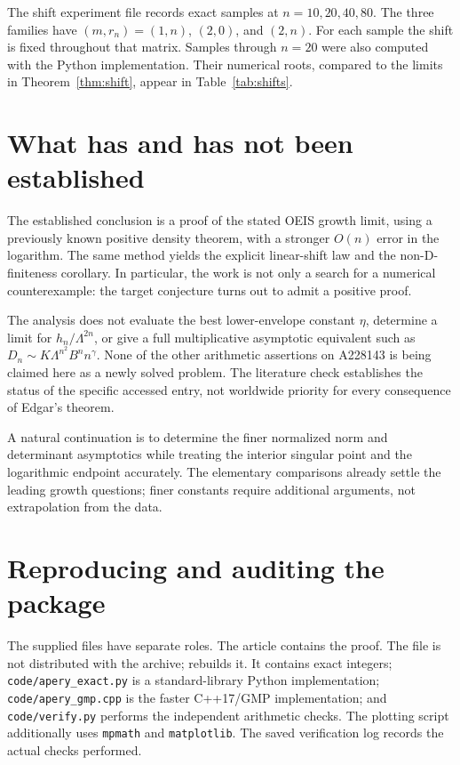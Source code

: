\documentclass[11pt,a4paper]{article}
\numberwithin{equation}{section}
\theoremstyle{remark}\newtheorem{remark}[theorem]{Remark}
\begin{document}
The shift experiment file records exact samples at $n=10,20,40,80$.
The three families have $(m,r_n)=(1,n)$, $(2,0)$, and $(2,n)$. For each sample the shift is fixed throughout
that matrix. Samples through $n=20$ were also computed with the Python
implementation. Their numerical roots, compared to the limits in
Theorem~\ref{thm:shift}, appear in Table~\ref{tab:shifts}.


\section{What has and has not been established}
The established conclusion is a proof of the stated OEIS growth limit, using
a previously known positive density theorem, with a stronger $O(n)$ error
in the logarithm. The same method yields the explicit linear-shift law and
the non-D-finiteness corollary. In particular, the work is not only a search
for a numerical counterexample: the target conjecture turns out to admit a
positive proof.

The analysis does not evaluate the best lower-envelope constant $\eta$,
determine a limit for $h_n/\Lambda^{2n}$, or give a full multiplicative
asymptotic equivalent such as $D_n\sim K\Lambda^{n^2}B^n n^\gamma$.
None of the other arithmetic assertions on A228143 is being claimed here as
a newly solved problem. The literature check establishes the status of the
specific accessed entry, not worldwide priority for every consequence of
Edgar's theorem.

A natural continuation is to determine the finer normalized norm and
determinant asymptotics while treating the interior singular point and the
logarithmic endpoint accurately. The elementary comparisons already settle
the leading growth questions; finer constants require additional arguments,
not extrapolation from the data.

\appendix
\section{Reproducing and auditing the package}
The supplied files have separate roles. The article contains the proof.
The file  is not distributed with the
archive;  rebuilds it. It contains exact integers;
\texttt{code/apery\_exact.py} is a standard-library Python implementation;
\texttt{code/apery\_gmp.cpp} is the faster C++17/GMP implementation;
and \texttt{code/verify.py} performs the independent arithmetic checks.
The plotting script additionally uses \texttt{mpmath} and \texttt{matplotlib}.
The saved verification log records the actual checks performed.
\end{document}

